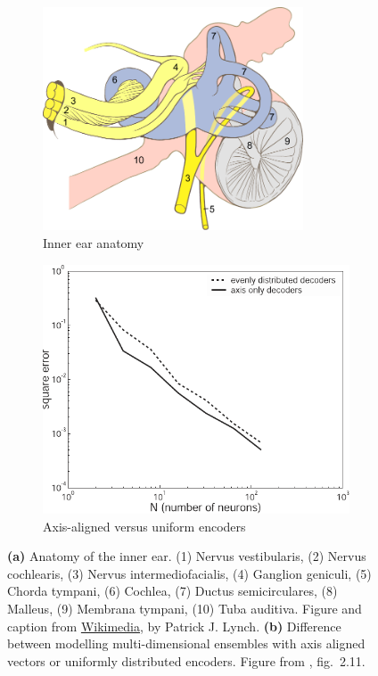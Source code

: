 \documentclass[10pt,letterpaper,oneside]{article}
\begin{document}
\begin{figure}
	\begin{subfigure}[b]{0.5\textwidth}
		\centering
		\includegraphics[width=0.85\textwidth]{media/ear_internal_anatomy_numbered.pdf}
		\caption{Inner ear anatomy}
		\label{fig:ear_internal_anatomy_numbered}
	\end{subfigure}
	\begin{subfigure}[b]{0.5\textwidth}
		\centering
		\includegraphics[width=\textwidth]{media/eliasmith_et_al_2003_axis_aligned.pdf}
		\caption{Axis-aligned versus uniform encoders}
		\label{fig:eliasmith_et_al_2003_axis_aligned}
	\end{subfigure}
	\caption{\textbf{(a)} Anatomy of the inner ear. (1) Nervus vestibularis, (2) Nervus cochlearis, (3) Nervus intermediofacialis, (4) Ganglion geniculi, (5) Chorda tympani, (6) Cochlea, (7) Ductus semicirculares, (8) Malleus, (9) Membrana tympani, (10) Tuba auditiva. Figure and caption from \href{https://commons.wikimedia.org/wiki/File:Ear_internal_anatomy_numbered.svg}{Wikimedia}, by Patrick J. Lynch. \textbf{(b)} Difference between modelling multi-dimensional ensembles with axis aligned vectors or uniformly distributed encoders. Figure from \cite{eliasmith2003neural}, fig.~2.11.}
\end{figure}
\end{document}
